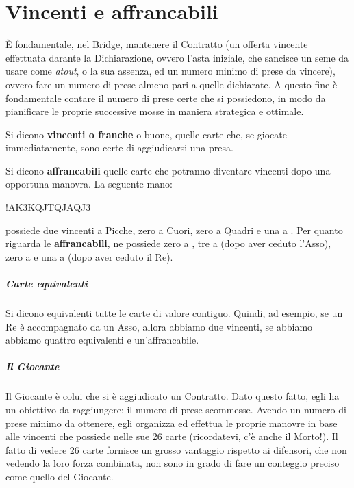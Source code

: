 \documentclass[../corsofiori.tex]{subfiles}
\begin{document}
\chapter{Vincenti e affrancabili}
\label{chap:lezione1}

\`E fondamentale, nel Bridge, mantenere il Contratto (un offerta vincente effettuata darante la Dichiarazione, ovvero
l'asta iniziale, che sancisce un seme da usare come \emph{atout}, o la sua assenza, ed un numero minimo di prese da
vincere), ovvero fare un numero di prese almeno pari a quelle dichiarate.
A questo fine è fondamentale contare il numero di prese certe che si possiedono, in modo da pianificare le proprie
successive mosse in maniera strategica e ottimale.

Si dicono \textbf{vincenti o franche} o buone, quelle carte che, se giocate immediatamente, sono certe di aggiudicarsi una
presa.

Si dicono \textbf{affrancabili} quelle carte che potranno diventare vincenti dopo una opportuna manovra.
La seguente mano:
\medskip

\hand*!{AK3}{KQJT}{QJ}{AQJ3}

\medskip

\noindent possiede due vincenti a Picche, zero a Cuori, zero a Quadri e una a \fio. Per quanto riguarda le \textbf{affrancabili}, ne
possiede zero a \pic, tre a \cu (dopo aver ceduto l'Asso), zero a \qu e una a \fio (dopo aver ceduto il Re).

\paragraph{Carte equivalenti} Si dicono equivalenti tutte le carte di valore contiguo. Quindi, ad esempio, se un
Re è accompagnato da un Asso, allora abbiamo due vincenti, se abbiamo  abbiamo quattro equivalenti
e un'affrancabile.

\paragraph{Il Giocante}
Il Giocante è colui che si è aggiudicato un Contratto. Dato questo fatto, egli ha un obiettivo da raggiungere: il
numero di prese scommesse. Avendo un numero di prese minimo da ottenere, egli organizza ed effettua le proprie manovre
in base alle vincenti che possiede nelle sue 26 carte (ricordatevi, c'è anche il Morto!). Il fatto di vedere 26 carte
fornisce un grosso vantaggio rispetto ai difensori, che non vedendo la loro forza combinata, non sono in grado di fare
un conteggio preciso come quello del Giocante.
\end{document}
